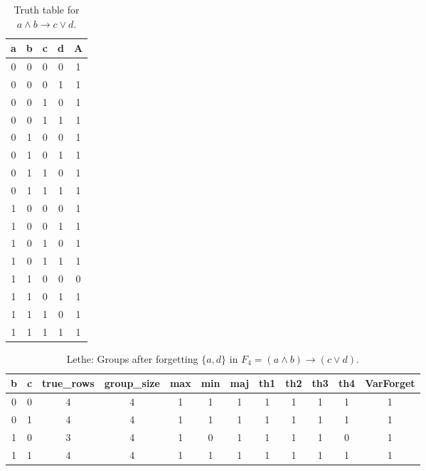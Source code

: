 \begin{table}[!tb]
    \centering
    \begin{tabular}{|c|c|c|c|c|}
        \hline
        \textbf{a} & \textbf{b} & \textbf{c} & \textbf{d} & \textbf{A} \\ \hline
        0 & 0 & 0 & 0 & 1 \\ \hline
        0 & 0 & 0 & 1 & 1 \\ \hline
        0 & 0 & 1 & 0 & 1 \\ \hline
        0 & 0 & 1 & 1 & 1 \\ \hline
        0 & 1 & 0 & 0 & 1 \\ \hline
        0 & 1 & 0 & 1 & 1 \\ \hline
        0 & 1 & 1 & 0 & 1 \\ \hline
        0 & 1 & 1 & 1 & 1 \\ \hline
        1 & 0 & 0 & 0 & 1 \\ \hline
        1 & 0 & 0 & 1 & 1 \\ \hline
        1 & 0 & 1 & 0 & 1 \\ \hline
        1 & 0 & 1 & 1 & 1 \\ \hline
        1 & 1 & 0 & 0 & 0 \\ \hline
        1 & 1 & 0 & 1 & 1 \\ \hline
        1 & 1 & 1 & 0 & 1 \\ \hline
        1 & 1 & 1 & 1 & 1 \\ \hline
    \end{tabular}
    \caption{Truth table for $a \land b \rightarrow c \lor d$.}
    \label{tab:truthtab}
\end{table}

\begin{table}[!tb]
    \centering
    \begin{tabular}{|c|c|c|c|c|c|c|c|c|c|c|c|}
        \hline
        \textbf{b} & \textbf{c} & \textbf{true\_rows} & \textbf{group\_size} & \textbf{max} & \textbf{min} & \textbf{maj} & \textbf{th1} & \textbf{th2} & \textbf{th3} & \textbf{th4} & \textbf{VarForget} \\ \hline
        \rowcolor{gray!40} 0 & 0 & 4 & 4 & 1 & 1 & 1 & 1 & 1 & 1 & 1 & 1 \\ \hline
        \rowcolor{blue!40} 0 & 1 & 4 & 4 & 1 & 1 & 1 & 1 & 1 & 1 & 1 & 1 \\ \hline
        \rowcolor{red!40} 1 & 0 & 3 & 4 & 1 & 0 & 1 & 1 & 1 & 1 & 0 & 1 \\ \hline
        \rowcolor{green!40} 1 & 1 & 4 & 4 & 1 & 1 & 1 & 1 & 1 & 1 & 1 & 1 \\ \hline
    \end{tabular}
    \caption{Lethe: Groups after forgetting $\{a, d\}$ in $F_{4} = (a \land b) \rightarrow (c \lor d)$.}
    \label{tab:lethe-F4-ad-groups}
\end{table}
